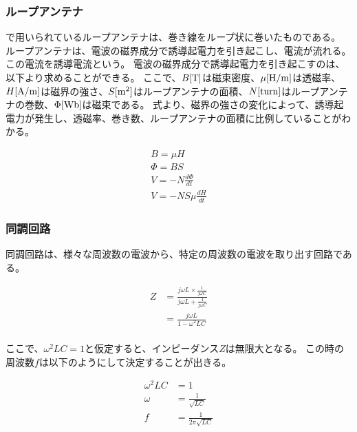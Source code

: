 \documentclass[report.tex]{subfiles}
\begin{document}
\subsubsection{ループアンテナ}

で用いられているループアンテナは、巻き線をループ状に巻いたものである。
ループアンテナは、電波の磁界成分で誘導起電力を引き起こし、電流が流れる。
この電流を誘導電流という。
電波の磁界成分で誘導起電力を引き起こすのは、以下より求めることができる。
ここで、\(B[\rm{T}]\)は磁束密度、\(\mu[\rm{H/m}]\)は透磁率、\(H[\rm{A/m}]\)は磁界の強さ、\(S[\rm{m^2}]\)はループアンテナの面積、\(N[\rm{turn}]\)はループアンテナの巻数、\(\Phi[\rm{Wb}]\)は磁束である。
式より、磁界の強さの変化によって、誘導起電力が発生し、透磁率、巻き数、ループアンテナの面積に比例していることがわかる。

\begin{align}
	B = \mu H               \\
	\Phi = B S              \\ %
	V = -N \frac{d\Phi}{dt} \\
	V = -N S \mu \frac{dH}{dt}
\end{align}

\subsubsection{同調回路}

同調回路は、様々な周波数の電波から、特定の周波数の電波を取り出す回路である。

\begin{align}
	Z & = \frac{j \omega L \times \frac{1}{j \omega C}}{j \omega L + \frac{1}{j \omega C}} \\
	  & = \frac{j \omega L}{1 - \omega^2 LC}                                               \\
\end{align}

ここで、$\omega^2 LC = 1$と仮定すると、インピーダンス\(Z\)は無限大となる。
この時の周波数\(f\)は以下のようにして決定することが出きる。

\begin{align}
	\omega^2 LC & = 1                                              \\
	\omega      & = \frac{1}{\sqrt{LC}}                            \\
	f           & = \frac{1}{2 \pi \sqrt{LC}} \label{eq:resonance}
\end{align}
\end{document}
